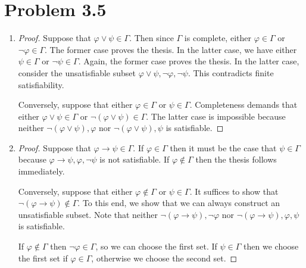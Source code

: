 \documentclass[a4paper]{article}
\begin{document}
\section{Problem 3.5}
\begin{enumerate}
\item
  \begin{proof}
    Suppose that $\varphi \vee \psi \in \Gamma$.
    Then since $\Gamma$ is complete, either $\varphi \in \Gamma$ or $\lnot \varphi \in \Gamma$.
    The former case proves the thesis.
    In the latter case, we have either $\psi \in \Gamma$ or $\lnot \psi \in \Gamma$.
    Again, the former case proves the thesis.
    In the latter case, consider the unsatisfiable subset $\varphi \vee \psi, \lnot \varphi, \lnot \psi$.
    This contradicts finite satisfiability.

    Conversely, suppose that either $\varphi \in \Gamma$ or $\psi \in \Gamma$.
    Completeness demands that either $\varphi \vee \psi \in \Gamma$ or $\lnot(\varphi \vee \psi) \in \Gamma$.
    The latter case is impossible because neither $\lnot(\varphi \vee \psi), \varphi$ nor $\lnot(\varphi \vee \psi), \psi$ is satisfiable.
  \end{proof}
\item
  \begin{proof}
    Suppose that $\varphi \to \psi \in \Gamma$.
    If $\varphi \in \Gamma$ then it must be the case that $\psi \in \Gamma$ because $\varphi \to \psi, \varphi, \lnot\psi$ is not satisfiable.
    If $\varphi \notin \Gamma$ then the thesis follows immediately.

    Conversely, suppose that either $\varphi \notin \Gamma$ or $\psi \in \Gamma$.
    It suffices to show that $\lnot(\varphi \to \psi) \notin \Gamma$.
    To this end, we show that we can always construct an unsatisfiable subset.
    Note that neither $\lnot(\varphi \to \psi), \lnot \varphi$ nor $\lnot(\varphi \to \psi), \varphi, \psi$ is satisfiable.

    If $\varphi \notin \Gamma$ then $\lnot\varphi \in \Gamma$, so we can choose the first set.
    If $\psi \in \Gamma$ then we choose the first set if $\varphi \in \Gamma$, otherwise we choose the second set.
  \end{proof}
\end{enumerate}

\end{document}
